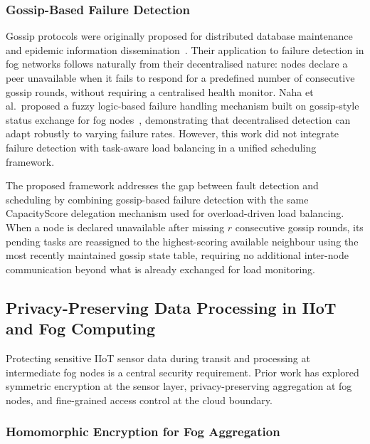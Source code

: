 \documentclass[conference]{IEEEtran}
\begin{document}
\subsubsection{Gossip-Based Failure Detection}

Gossip protocols were originally proposed for distributed database maintenance and epidemic information dissemination~\cite{demers1988epidemic}. Their application to failure detection in fog networks follows naturally from their decentralised nature: nodes declare a peer unavailable when it fails to respond for a predefined number of consecutive gossip rounds, without requiring a centralised health monitor. Naha et al.\ proposed a fuzzy logic-based failure handling mechanism built on gossip-style status exchange for fog nodes~\cite{naha2021}, demonstrating that decentralised detection can adapt robustly to varying failure rates. However, this work did not integrate failure detection with task-aware load balancing in a unified scheduling framework.

The proposed framework addresses the gap between fault detection and scheduling by combining gossip-based failure detection with the same CapacityScore delegation mechanism used for overload-driven load balancing. When a node is declared unavailable after missing $r$ consecutive gossip rounds, its pending tasks are reassigned to the highest-scoring available neighbour using the most recently maintained gossip state table, requiring no additional inter-node communication beyond what is already exchanged for load monitoring.

\subsection{Privacy-Preserving Data Processing in IIoT and Fog Computing}

Protecting sensitive IIoT sensor data during transit and processing at intermediate fog nodes is a central security requirement. Prior work has explored symmetric encryption at the sensor layer, privacy-preserving aggregation at fog nodes, and fine-grained access control at the cloud boundary.

\subsubsection{Homomorphic Encryption for Fog Aggregation}
\end{document}
